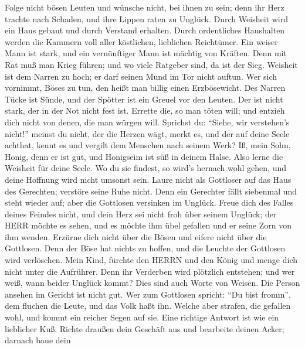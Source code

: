  Folge nicht bösen Leuten und wünsche nicht, bei ihnen zu
sein;  denn ihr Herz trachte nach Schaden, und ihre Lippen
raten zu Unglück.  Durch Weisheit wird ein Haus gebaut und
durch Verstand erhalten.  Durch ordentliches Haushalten
werden die Kammern voll aller köstlichen, lieblichen Reichtümer.
 Ein weiser Mann ist stark, und ein vernünftiger Mann ist
mächtig von Kräften.  Denn mit Rat muß man Krieg führen; und
wo viele Ratgeber sind, da ist der Sieg.  Weisheit ist dem
Narren zu hoch; er darf seinen Mund im Tor nicht auftun. 
Wer sich vornimmt, Böses zu tun, den heißt man billig einen
Erzbösewicht.  Des Narren Tücke ist Sünde, und der Spötter
ist ein Greuel vor den Leuten.  Der ist nicht stark, der in
der Not nicht fest ist.  Errette die, so man töten will;
und entzieh dich nicht von denen, die man würgen will. 
Sprichst du: ``Siehe, wir verstehen's nicht!'' meinst du nicht, der die
Herzen wägt, merkt es, und der auf deine Seele achthat, kennt es und
vergilt dem Menschen nach seinem Werk?  Iß, mein Sohn,
Honig, denn er ist gut, und Honigseim ist süß in deinem Halse.
 Also lerne die Weisheit für deine Seele. Wo du sie
findest, so wird's hernach wohl gehen, und deine Hoffnung wird nicht
umsonst sein.  Laure nicht als Gottloser auf das Haus des
Gerechten; verstöre seine Ruhe nicht.  Denn ein Gerechter
fällt siebenmal und steht wieder auf; aber die Gottlosen versinken im
Unglück.  Freue dich des Falles deines Feindes nicht, und
dein Herz sei nicht froh über seinem Unglück;  der HERR
möchte es sehen, und es möchte ihm übel gefallen und er seine Zorn von
ihm wenden.  Erzürne dich nicht über die Bösen und eifere
nicht über die Gottlosen.  Denn der Böse hat nichts zu
hoffen, und die Leuchte der Gottlosen wird verlöschen. 
Mein Kind, fürchte den HERRN und den König und menge dich nicht unter
die Aufrührer.  Denn ihr Verderben wird plötzlich
entstehen; und wer weiß, wann beider Unglück kommt?  Dies
sind auch Worte von Weisen. Die Person ansehen im Gericht ist nicht gut.
 Wer zum Gottlosen spricht: ``Du bist fromm'', dem fluchen
die Leute, und das Volk haßt ihn.  Welche aber strafen, die
gefallen wohl, und kommt ein reicher Segen auf sie.  Eine
richtige Antwort ist wie ein lieblicher Kuß.  Richte
draußen dein Geschäft aus und bearbeite deinen Acker; darnach baue dein
